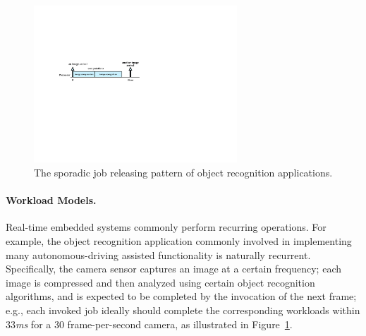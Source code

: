 \begin{figure}
\vspace{-4mm}
	\begin{center}
          \includegraphics[width=3in]{images/sporadiceg.pdf} 
    \end{center}
    \vspace{-2mm}
\caption{\small The sporadic job releasing pattern of object recognition applications.}
\vspace{-2mm}   
\label{fig:sporadiceg}
\end{figure} \normalsize
\vspace{-2mm} \paragraph{Workload Models.} Real-time embedded systems commonly perform recurring operations. For example, the object recognition application commonly involved in implementing many autonomous-driving assisted functionality is naturally recurrent. Specifically, the camera sensor captures an image at a certain frequency; each image is compressed and then analyzed using certain object recognition algorithms, and is expected to be completed by the invocation of the next frame; e.g., each invoked job ideally should complete the corresponding workloads within 33\textit{ms} for a 30 frame-per-second camera, as illustrated in Figure~\ref{fig:sporadiceg}.  

